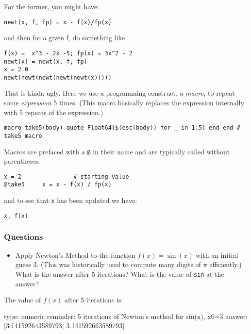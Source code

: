 \documentclass[12pt]{article}
\begin{document}
For the former, you might have:



\begin{verbatim}
newt(x, f, fp) = x - f(x)/fp(x)
\end{verbatim}
and then for a given f, do something like



\begin{verbatim}
f(x) =  x^3 - 2x -5; fp(x) = 3x^2 - 2
newt(x) = newt(x, f, fp)
x = 2.0
newt(newt(newt(newt(newt(x)))))
\end{verbatim}
That is kinda ugly. Here we use a programming construct, a \emph{macro},
to repeat some \emph{expression} 5 times. (This macro basically replaces
the expression internally with 5 repeats of the expression.)



\begin{verbatim}
macro take5(body) quote Float64[$(esc(body)) for _ in 1:5] end end # take5 macro
\end{verbatim}
Macros are prefaced with a \texttt{@} in their name and are typically
called without parentheses:



\begin{verbatim}
x = 2               # starting value
@take5     x = x - f(x) / fp(x)
\end{verbatim}
and to see that \texttt{x} has been updated we have:



\begin{verbatim}
x, f(x)
\end{verbatim}
\subsubsection{Questions}

\begin{itemize}
\itemsep1pt\parskip0pt
\item
  Apply Newton's Method to the function $f(x) = \sin(x)$ with an initial
  guess $3$. (This was historically used to compute many digits of $\pi$
  efficiently.) What is the answer after 5 iterations? What is the value
  of \texttt{sin} at the answer?
\end{itemize}

The value of $f(x)$ after 5 iterations is:

\begin{answer}
    type: numeric
    reminder: 5 iterations of Newton's method for sin(x), x0=3
    answer: [3.141592643589793, 3.141592663589793]

\end{answer}
\end{document}
